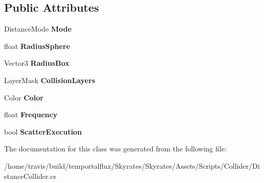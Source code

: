 \subsection*{Public Attributes}
\begin{DoxyCompactItemize}
\item 
\hypertarget{class_skyrates_1_1_mono_1_1_distance_collider_a9c5cd20a5747bac5271f43e9134f55ac}{Distance\-Mode {\bfseries Mode}}\label{class_skyrates_1_1_mono_1_1_distance_collider_a9c5cd20a5747bac5271f43e9134f55ac}

\item 
\hypertarget{class_skyrates_1_1_mono_1_1_distance_collider_a2f4bfd713124767baf24e3e109a72d87}{float {\bfseries Radius\-Sphere}}\label{class_skyrates_1_1_mono_1_1_distance_collider_a2f4bfd713124767baf24e3e109a72d87}

\item 
\hypertarget{class_skyrates_1_1_mono_1_1_distance_collider_acf44d54d0eba9a24d66cb7f31b6686cf}{Vector3 {\bfseries Radius\-Box}}\label{class_skyrates_1_1_mono_1_1_distance_collider_acf44d54d0eba9a24d66cb7f31b6686cf}

\item 
\hypertarget{class_skyrates_1_1_mono_1_1_distance_collider_a97bcb5318de33e5ab21a33fe7e364565}{Layer\-Mask {\bfseries Collision\-Layers}}\label{class_skyrates_1_1_mono_1_1_distance_collider_a97bcb5318de33e5ab21a33fe7e364565}

\item 
\hypertarget{class_skyrates_1_1_mono_1_1_distance_collider_afdf4b791a4affb8ff84fccc2208ba566}{Color {\bfseries Color}}\label{class_skyrates_1_1_mono_1_1_distance_collider_afdf4b791a4affb8ff84fccc2208ba566}

\item 
\hypertarget{class_skyrates_1_1_mono_1_1_distance_collider_a08f21f9dd6c9559d844121b979ed0975}{float {\bfseries Frequency}}\label{class_skyrates_1_1_mono_1_1_distance_collider_a08f21f9dd6c9559d844121b979ed0975}

\item 
\hypertarget{class_skyrates_1_1_mono_1_1_distance_collider_a5d28c93391bad82da5ef3e7f641479de}{bool {\bfseries Scatter\-Execution}}\label{class_skyrates_1_1_mono_1_1_distance_collider_a5d28c93391bad82da5ef3e7f641479de}

\end{DoxyCompactItemize}


The documentation for this class was generated from the following file\-:\begin{DoxyCompactItemize}
\item 
/home/travis/build/temportalflux/\-Skyrates/\-Skyrates/\-Assets/\-Scripts/\-Collider/Distance\-Collider.\-cs\end{DoxyCompactItemize}
